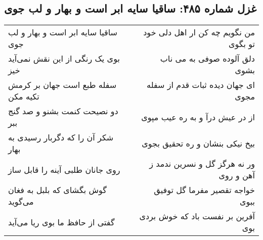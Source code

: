 \begin{center}
\section*{غزل شماره ۴۸۵: ساقیا سایه ابر است و بهار و لب جوی}
\label{sec:sh485}
\begin{longtable}{l p{0.5cm} r}
ساقیا سایه ابر است و بهار و لب جوی
&&
من نگویم چه کن ار اهل دلی خود تو بگوی
\\
بوی یک رنگی از این نقش نمی‌آید خیز
&&
دلق آلوده صوفی به می ناب بشوی
\\
سفله طبع است جهان بر کرمش تکیه مکن
&&
ای جهان دیده ثبات قدم از سفله مجوی
\\
دو نصیحت کنمت بشنو و صد گنج ببر
&&
از در عیش درآ و به ره عیب مپوی
\\
شکر آن را که دگربار رسیدی به بهار
&&
بیخ نیکی بنشان و ره تحقیق بجوی
\\
روی جانان طلبی آینه را قابل ساز
&&
ور نه هرگز گل و نسرین ندمد ز آهن و روی
\\
گوش بگشای که بلبل به فغان می‌گوید
&&
خواجه تقصیر مفرما گل توفیق ببوی
\\
گفتی از حافظ ما بوی ریا می‌آید
&&
آفرین بر نفست باد که خوش بردی بوی
\\
\end{longtable}
\end{center}
